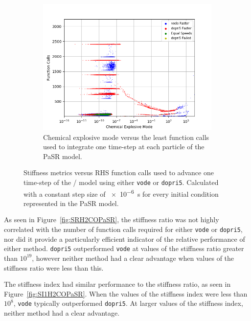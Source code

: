 \documentclass[12pt]{ussci}
\begin{document}
\begin{figure}[htbp]
\begin{subfigure}{0.43\textwidth}
        \label{fig:SI2H2COPaSR}
    \end{subfigure}
    \begin{subfigure}{0.43\textwidth}
        \includegraphics[width=\linewidth]{H2_CO/PaSR_Fn_Work_CEMA_Groupings_1e-06.png}
        \caption{Chemical explosive mode versus the least function calls used to integrate one time-step at each particle of the PaSR model.}
        \label{fig:CEMH2COPaSR}
    \end{subfigure}
    \caption{Stiffness metrics versus RHS function calls used to advance one time-step of the \slash {} model using either \texttt{vode} or \texttt{dopri5}.  Calculated with a constant step size of \SI{e-6}{\second} for every initial condition represented in the PaSR model.}
    \label{fig:H2COPaSRStiffness}
\end{figure}

As seen in Figure~\ref{fig:SRH2COPaSR}, the stiffness ratio was not highly correlated with the number of function calls required for either \texttt{vode} or \texttt{dopri5}, nor did it provide a particularly efficient indicator of the relative performance of either method.
\texttt{dopri5} outperformed \texttt{vode} at values of the stiffness ratio greater than $10^{19}$, however neither method had a clear advantage when values of the stiffness ratio were less than this.

The stiffness index had similar performance to the stiffness ratio, as seen in Figure~\ref{fig:SI1H2COPaSR}.
When the values of the stiffness index were less than $10^8$, \texttt{vode} typically outperformed \texttt{dopri5}.
At larger values of the stiffness index, neither method had a clear advantage.
\end{document}
